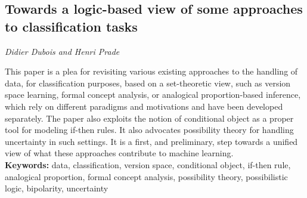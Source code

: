 \documentclass[../booklet.tex]{subfiles}
\begin{document}
\subsection[Towards a logic-based view of some approaches to classification tasks. {\it Didier Dubois and Henri Prade}]{Towards a logic-based view of some approaches to classification tasks}
 

\begin{center}
  {\it Didier Dubois and Henri Prade}
\end{center}

\vskip 0.8cm


This  paper is a plea for revisiting various existing approaches to the handling of data, for classification purposes, based on a set-theoretic view, such as version space learning, formal concept analysis, or analogical proportion-based inference, which rely on different paradigms and motivations and have been developed separately. The paper also exploits the notion of conditional object as a proper tool for 
modeling if-then rules. It also advocates possibility theory for handling uncertainty in such settings. 
It is a first, and preliminary, step towards a unified view of what these approaches contribute to machine learning. \\

{\bf Keywords:} data, classification, version space, conditional object, if-then rule, analogical proportion, formal concept analysis, possibility theory, possibilistic logic, bipolarity, uncertainty 
\end{document}
